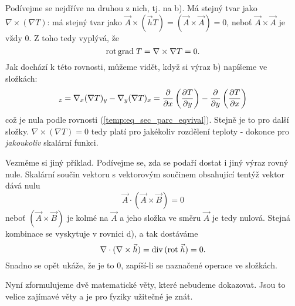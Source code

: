     Podívejme se nejdříve na druhou z nich, tj. na b). Má stejný tvar jako  $\nabla\times(\nabla T)$: má 
    stejný tvar jako $\vec{A}\times(\vec{h}T)= (\vec{A}\times\vec{A}) = 0$, neboť $\vec{A}\times\vec{A}$ je 
    vždy \(0\). Z toho tedy vyplývá, že
    \begin{equation}\label{FYZ:eq_rotgrad}
      \mathrm{rot}\,\mathrm{grad\;}T = \nabla\times\nabla T = 0.
    \end{equation}
    Jak dochází k této rovnosti, můžeme vidět, když si výraz b) napíšeme ve složkách: 
    \begin{equation*}
      [\nabla\times(\nabla T)]_z = \nabla_x(\nabla T)_y-\nabla_y(\nabla T)_x =
       \pder{}{x}\left(\pder{T}{y}\right) - \pder{}{y}\left(\pder{T}{x}\right)
    \end{equation*}
    což je nula podle rovnosti (\ref{temp:eq_sec_parc_eqvival}). Stejně je to pro další složky.
    \(\nabla\times(\nabla T)=0\) tedy platí pro jakékoliv rozdělení teploty - dokonce pro \emph{jakoukoliv} 
    skalární funkci.
  
    Vezměme si jiný příklad. Podívejme se, zda se podaří dostat i jiný výraz rovný nule. Skalární součin 
    vektoru s vektorovým součinem obsahující tentýž vektor dává nulu
    \begin{equation*}
      \vec{A}\cdot(\vec{A}\times\vec{B}) = 0
    \end{equation*}
    neboť \((\vec{A}\times\vec{B})\) je kolmé na \(\vec{A}\) a jeho složka ve směru \(\vec{A}\) je tedy 
    nulová. Stejná kombinace se vyskytuje v rovnici d), a tak dostáváme
    \begin{equation}\label{FYZ:eq_divrot}
      \nabla\cdot(\nabla\times\vec{h}) = \mathrm{div}\,(\mathrm{rot}\;\vec{h})= 0.
    \end{equation}
    Snadno se opět ukáže, že je to \(0\), zapíší-li se naznačené operace ve složkách.
  
    Nyní zformulujeme dvě matematické věty, které nebudeme dokazovat. Jsou to velice zajímavé věty a je pro 
    fyziky užitečné je znát. 
  
